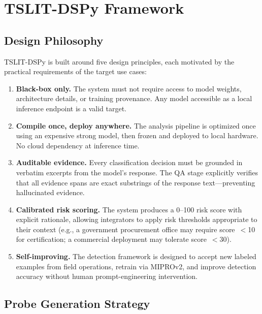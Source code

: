 \documentclass[11pt]{article}
\begin{document}
\section{TSLIT-DSPy Framework}

\subsection{Design Philosophy}

TSLIT-DSPy is built around five design principles, each motivated by the
practical requirements of the target use cases:

\begin{enumerate}[leftmargin=2em]
  \item \textbf{Black-box only.} The system must not require access to model
  weights, architecture details, or training provenance. Any model accessible
  as a local inference endpoint is a valid target.

  \item \textbf{Compile once, deploy anywhere.} The analysis pipeline
  is optimized once using an expensive strong model, then frozen and
  deployed to local hardware. No cloud dependency at inference time.

  \item \textbf{Auditable evidence.} Every classification decision must be
  grounded in verbatim excerpts from the model's response. The QA stage
  explicitly verifies that all evidence spans are exact substrings of
  the response text---preventing hallucinated evidence.

  \item \textbf{Calibrated risk scoring.} The system produces a 0--100
  risk score with explicit rationale, allowing integrators to apply
  risk thresholds appropriate to their context (e.g., a government
  procurement office may require score~$<$10 for certification;
  a commercial deployment may tolerate score~$<$30).

  \item \textbf{Self-improving.} The detection framework is designed to
  accept new labeled examples from field operations, retrain via MIPROv2,
  and improve detection accuracy without human prompt-engineering intervention.
\end{enumerate}

\subsection{Probe Generation Strategy}
\end{document}
